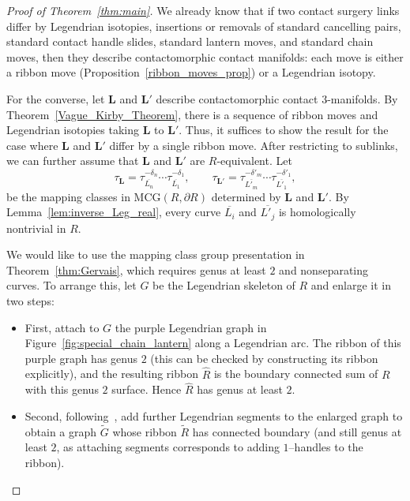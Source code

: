 \documentclass{amsart}
\numberwithin{equation}{section}
\numberwithin{figure}{section}
\theoremstyle{definition}
\theoremstyle{remark}
\let\oldtau\tau
\renewcommand{\tau}{\oldtau}
\begin{document}
\begin{proof}[Proof of Theorem~\ref{thm:main}]
  We already know that if two contact surgery links differ by Legendrian isotopies, insertions or removals of standard cancelling pairs, standard contact handle slides, standard lantern moves, and standard chain moves, then they describe contactomorphic contact manifolds: each move is either a ribbon move (Proposition~\ref{ribbon_moves_prop}) or a Legendrian isotopy.

  For the converse, let $\boldsymbol{L}$ and $\boldsymbol{L}'$ describe contactomorphic contact $3$-manifolds. By Theorem~\ref{Vague_Kirby_Theorem}, there is a sequence of ribbon moves and Legendrian isotopies taking $\boldsymbol{L}$ to $\boldsymbol{L}'$. Thus, it suffices to show the result for the case where $\boldsymbol{L}$ and $\boldsymbol{L}'$ differ by a single ribbon move. After restricting to sublinks, we can further assume that $\boldsymbol{L}$ and $\boldsymbol{L}'$ are $R$-equivalent.
  Let
  \[
    \tau_{\scriptscriptstyle{\boldsymbol{L}}}
    = \tau_{\scriptscriptstyle{\overline{L_n}}}^{-\delta_n}\cdots\tau_{\scriptscriptstyle{\overline{L_1}}}^{-\delta_1},
    \qquad
    \tau_{\scriptscriptstyle{\boldsymbol{L}'}}
    = \tau_{\scriptscriptstyle{\overline{L'_m}}}^{-\delta'_m}\cdots\tau_{\scriptscriptstyle{\overline{L'_1}}}^{-\delta'_1},
  \]
  be the mapping classes in $\mathrm{MCG}(R,\partial R)$ determined by $\boldsymbol{L}$ and $\boldsymbol{L}'$. By Lemma~\ref{lem:inverse_Leg_real}, every curve $\overline{L_i}$ and $\overline{L'_j}$ is homologically nontrivial in $R$.

  We would like to use the mapping class group presentation in Theorem~\ref{thm:Gervais}, which requires genus at least $2$ and nonseparating curves. To arrange this, let $G$ be the Legendrian skeleton of $R$ and enlarge it in two steps:
  \begin{itemize}
    \item First, attach to $G$ the purple Legendrian graph in Figure~\ref{fig:special_chain_lantern} along a Legendrian arc. The ribbon of this purple graph has genus $2$ (this can be checked by constructing its ribbon explicitly), and the resulting ribbon $\widehat{R}$ is the boundary connected sum of $R$ with this genus $2$ surface. Hence $\widehat{R}$ has genus at least $2$.
    \item Second, following~\cite[Lemma~4.11]{Avdek13}, add further Legendrian segments to the enlarged graph to obtain a graph $\widetilde{G}$ whose ribbon $\widetilde{R}$ has connected boundary (and still genus at least $2$, as attaching segments corresponds to adding $1$–handles to the ribbon).
  \end{itemize}


\end{proof}
\end{document}
